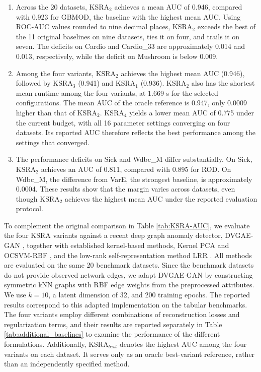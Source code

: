 \documentclass[ASNA,twocolumn]{USG} %
\begin{document}
\begin{enumerate}[\indent (1)]
    \item Across the 20 datasets, KSRA$_2$ achieves a mean AUC of 0.946, compared with 0.923 for GBMOD, the baseline with the highest mean AUC. Using ROC-AUC values rounded to nine decimal places, KSRA$_2$ exceeds the best of the 11 original baselines on nine datasets, ties it on four, and trails it on seven. The deficits on Cardio and Cardio\_33 are approximately 0.014 and 0.013, respectively, while the deficit on Mushroom is below 0.009.
    \item Among the four variants, KSRA$_2$ achieves the highest mean AUC (0.946), followed by KSRA$_3$ (0.941) and KSRA$_1$ (0.936). KSRA$_2$ also has the shortest mean runtime among the four variants, at 1.669 s for the selected configurations. The mean AUC of the oracle reference is 0.947, only 0.0009 higher than that of KSRA$_2$. KSRA$_4$ yields a lower mean AUC of 0.775 under the current budget, with all 16 parameter settings converging on four datasets. Its reported AUC therefore reflects the best performance among the settings that converged.
    \item The performance deficits on Sick and Wdbc\_M differ substantially. On Sick, KSRA$_2$ achieves an AUC of 0.811, compared with 0.895 for ROD. On Wdbc\_M, the difference from VarE, the strongest baseline, is approximately 0.0004. These results show that the margin varies across datasets, even though KSRA$_2$ achieves the highest mean AUC under the reported evaluation protocol.
\end{enumerate}

To complement the original comparison in Table \ref{tab:KSRA-AUC}, we evaluate the four KSRA variants against a recent deep graph anomaly detector, DVGAE-GAN \cite{khan2024anomalous}, together with established kernel-based methods, Kernel PCA \cite{hoffmann2007kernel} and OCSVM-RBF \cite{scholkopf2001estimating}, and the low-rank self-representation method LRR \cite{liu2012exact}. All methods are evaluated on the same 20 benchmark datasets. Since the benchmark datasets do not provide observed network edges, we adapt DVGAE-GAN by constructing symmetric kNN graphs with RBF edge weights from the preprocessed attributes. We use $k=10$, a latent dimension of 32, and 200 training epochs. The reported results correspond to this adapted implementation on the tabular benchmarks. The four variants employ different combinations of reconstruction losses and regularization terms, and their results are reported separately in Table \ref{tab:additional_baselines} to examine the performance of the different formulations. Additionally, KSRA$_{best}$ denotes the highest AUC among the four variants on each dataset. It serves only as an oracle best-variant reference, rather than an independently specified method.
\end{document}
